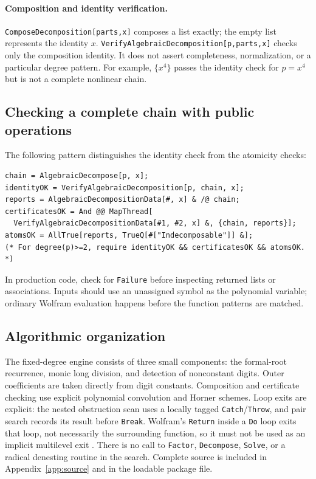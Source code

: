 \documentclass[11pt,a4paper]{article}
\numberwithin{equation}{section}
\theoremstyle{definition}
\theoremstyle{remark}
\newcommand{\code}[1]{\texttt{#1}}
\begin{document}
\paragraph{Composition and identity verification.}
\code{ComposeDecomposition[parts,x]} composes a list exactly; the empty list
represents the identity $x$.
\code{VerifyAlgebraicDecomposition[p,parts,x]} checks only the composition
identity. It does not assert completeness, normalization, or a particular
degree pattern. For example, $\{x^4\}$ passes the identity check for $p=x^4$
but is not a complete nonlinear chain.

\subsection{Checking a complete chain with public operations}
The following pattern distinguishes the identity check from the atomicity
checks:
\begin{lstlisting}
chain = AlgebraicDecompose[p, x];
identityOK = VerifyAlgebraicDecomposition[p, chain, x];
reports = AlgebraicDecompositionData[#, x] & /@ chain;
certificatesOK = And @@ MapThread[
  VerifyAlgebraicDecompositionData[#1, #2, x] &, {chain, reports}];
atomsOK = AllTrue[reports, TrueQ[#["Indecomposable"]] &];
(* For degree(p)>=2, require identityOK && certificatesOK && atomsOK. *)
\end{lstlisting}
In production code, check for \code{Failure} before inspecting returned lists
or associations. Inputs should use an unassigned symbol as the polynomial
variable; ordinary Wolfram evaluation happens before the function patterns
are matched.

\subsection{Algorithmic organization}
The fixed-degree engine consists of three small components: the formal-root
recurrence, monic long division, and detection of nonconstant digits. Outer
coefficients are taken directly from digit constants. Composition and
certificate checking use explicit polynomial convolution and Horner schemes.
Loop exits are explicit: the nested obstruction scan uses a locally tagged
\code{Catch}/\code{Throw}, and pair search records its result before
\code{Break}. Wolfram's \code{Return} inside a \code{Do} loop exits that loop,
not necessarily the surrounding function, so it must not be used as an
implicit multilevel exit \cite{Return}.
There is no call to \code{Factor}, \code{Decompose}, \code{Solve}, or a radical
denesting routine in the search. Complete source is included in
Appendix~\ref{app:source} and in the loadable package file.
\end{document}
